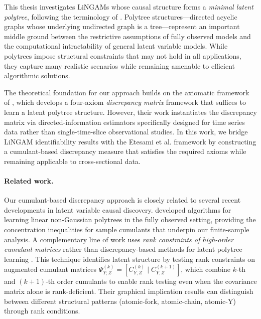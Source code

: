 \documentclass[11pt,a4paper]{article}
\numberwithin{equation}{section}
\begin{document}
This thesis investigates LiNGAMs whose causal structure forms a \emph{minimal latent polytree}, following the terminology of \citet{etesami:kiyavash:coleman:2016}. Polytree structures—directed acyclic graphs whose underlying undirected graph is a tree—represent an important middle ground between the restrictive assumptions of fully observed models and the computational intractability of general latent variable models. While polytrees impose structural constraints that may not hold in all applications, they capture many realistic scenarios while remaining amenable to efficient algorithmic solutions.

The theoretical foundation for our approach builds on the axiomatic framework of \citet{etesami:kiyavash:coleman:2016}, which develops a four-axiom \emph{discrepancy matrix} framework that suffices to learn a latent polytree structure. However, their work instantiates the discrepancy matrix via directed-information estimators specifically designed for time series data rather than single-time-slice observational studies. In this work, we bridge LiNGAM identifiability results with the Etesami et al. framework by constructing a cumulant-based discrepancy measure that satisfies the required axioms while remaining applicable to cross-sectional data.

\paragraph{Related work.} Our cumulant-based discrepancy approach is closely related to several recent developments in latent variable causal discovery. \citet{tramontano:monod:drton:2022} developed algorithms for learning linear non-Gaussian polytrees in the fully observed setting, providing the concentration inequalities for sample cumulants that underpin our finite-sample analysis. A complementary line of work uses \emph{rank constraints of high-order cumulant matrices} rather than discrepancy-based methods for latent polytree learning \citep{cai:etal:2024:rank}. This technique identifies latent structure by testing rank constraints on augmented cumulant matrices $\Psi^{(k)}_{Y;Z} = [C^{(k)}_{Y,Z} \mid C^{(k+1)}_{Y,Z}]$, which combine $k$-th and $(k+1)$-th order cumulants to enable rank testing even when the covariance matrix alone is rank-deficient. Their graphical implication results can distinguish between different structural patterns (atomic-fork, atomic-chain, atomic-Y) through rank conditions.
\end{document}
